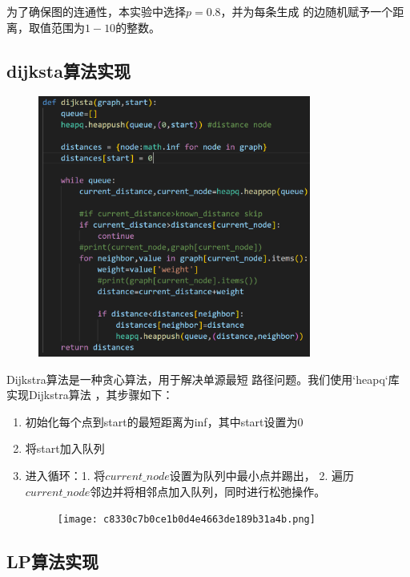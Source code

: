 \documentclass[10pt,a4paper,oneside]{article}
\begin{document}
为了确保图的连通性，本实验中选择$p=0.8$，并为每条生成
的边随机赋予一个距离，取值范围为$1-10$的整数。

\subsection{dijksta算法实现}

\begin{figure}[H]
    \centering
    \includegraphics[width=0.8\textwidth]{屏幕截图 2024-10-18 132954.png}
\end{figure}

Dijkstra算法是一种贪心算法，用于解决单源最短
路径问题。我们使用`heapq`库实现Dijkstra算法
，其步骤如下：

\begin{enumerate}
    \item 初始化每个点到start的最短距离为inf，其中start设置为0
    \item 将start加入队列
    \item 进入循环：1. 将$current\_node$设置为队列中最小点并踢出，
    2. 遍历$current\_node$邻边并将相邻点加入队列，同时进行松弛操作。
    \begin{figure}[H]
        \centering
        \texttt{[image: c8330c7b0ce1b0d4e4663de189b31a4b.png]}
    \end{figure}
    
\end{enumerate}


\subsection{LP算法实现}
\end{document}
